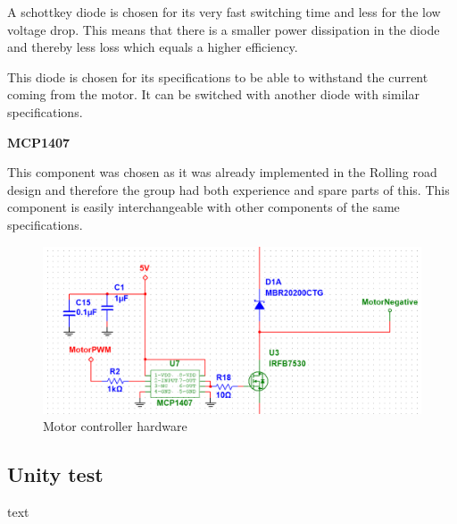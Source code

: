 A schottkey diode is chosen for its very fast switching time and less for the low voltage drop. This means that there is a smaller power dissipation in the diode and thereby less loss which equals a higher efficiency. 

This diode is chosen for its specifications to be able to withstand the current coming from the motor. It can be switched with another diode with similar specifications.

\textbf{MCP1407}

This component was chosen as it was already implemented in the Rolling road design and therefore the group had both experience and spare parts of this. This component is easily interchangeable with other components of the same specifications. 

\begin{figure}[H]
	\centering
	\includegraphics[width=0.85\linewidth]{Hardware/Pictures/Motorstyring}
	\caption{Motor controller hardware}
	\label{fig:Motorcontroller}
\end{figure}


\subsection{Unity test}
text